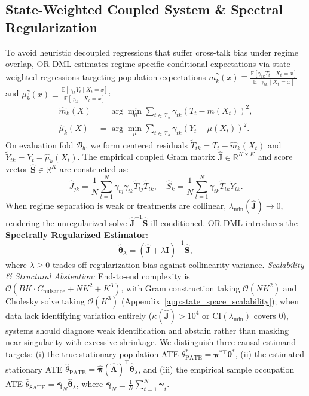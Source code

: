 \documentclass[twoside]{article}
\theoremstyle{definition}
\newcommand{\E}{\mathbb{E}}
\newcommand{\R}{\mathbb{R}}
\begin{document}
\subsection{State-Weighted Coupled System \& Spectral Regularization}
To avoid heuristic decoupled regressions that suffer cross-talk bias under regime overlap, OR-DML estimates regime-specific conditional expectations via state-weighted regressions targeting population expectations $m_k^\gamma(x) \equiv \frac{\E[\gamma_{tk} T_t \mid X_t=x]}{\E[\gamma_{tk} \mid X_t=x]}$ and $\mu_k^\gamma(x) \equiv \frac{\E[\gamma_{tk} Y_t \mid X_t=x]}{\E[\gamma_{tk} \mid X_t=x]}$:
\begin{align}
    \hat{m}_k(X) &= \arg\min_{m} \sum_{t \in \mathcal{T}_b} \gamma_{tk} (T_t - m(X_t))^2, \label{eq:nuisance_m} \\
    \hat{\mu}_k(X) &= \arg\min_{\mu} \sum_{t \in \mathcal{T}_b} \gamma_{tk} (Y_t - \mu(X_t))^2. \label{eq:nuisance_mu}
\end{align}
On evaluation fold $\mathcal{B}_b$, we form centered residuals $\tilde{T}_{tk} = T_t - \hat{m}_k(X_t)$ and $\tilde{Y}_{tk} = Y_t - \hat{\mu}_k(X_t)$. The empirical coupled Gram matrix $\hat{\boldsymbol{J}} \in \R^{K \times K}$ and score vector $\hat{\boldsymbol{S}} \in \R^K$ are constructed as:
\begin{equation}
    \hat{J}_{jk} = \frac{1}{N}\sum_{t=1}^N \gamma_{tj}\gamma_{tk} \tilde{T}_{tj} \tilde{T}_{tk}, \quad \hat{S}_k = \frac{1}{N}\sum_{t=1}^N \gamma_{tk} \tilde{T}_{tk} \tilde{Y}_{tk}.
\end{equation}
When regime separation is weak or treatments are collinear, $\lambda_{\min}(\hat{\boldsymbol{J}}) \to 0$, rendering the unregularized solve $\hat{\boldsymbol{J}}^{-1}\hat{\boldsymbol{S}}$ ill-conditioned. OR-DML introduces the \textbf{Spectrally Regularized Estimator}:
\begin{equation}
\label{eq:theta_spectral}
    \hat{\boldsymbol{\theta}}_\lambda = (\hat{\boldsymbol{J}} + \lambda \boldsymbol{I})^{-1} \hat{\boldsymbol{S}},
\end{equation}
where $\lambda \ge 0$ trades off regularization bias against collinearity variance.
\emph{Scalability \& Structural Abstention:} End-to-end complexity is $\mathcal{O}(B K \cdot C_{\mathrm{nuisance}} + N K^2 + K^3)$, with Gram construction taking $\mathcal{O}(N K^2)$ and Cholesky solve taking $\mathcal{O}(K^3)$ (Appendix~\ref{app:state_space_scalability}); when data lack identifying variation entirely ($\kappa(\hat{\boldsymbol{J}}) > 10^4$ or $\text{CI}(\lambda_{\min})$ covers 0), systems should diagnose weak identification and abstain rather than masking near-singularity with excessive shrinkage.
We distinguish three causal estimand targets: (i) the true stationary population ATE $\theta_{\mathrm{PATE}}^* = \boldsymbol{\pi}^{*\top} \boldsymbol{\theta}^*$, (ii) the estimated stationary ATE $\hat{\theta}_{\mathrm{PATE}} = \hat{\boldsymbol{\pi}}(\hat{\boldsymbol{\Lambda}})^\top \hat{\boldsymbol{\theta}}_\lambda$, and (iii) the empirical sample occupation ATE $\hat{\theta}_{\mathrm{SATE}} = \bar{\boldsymbol{\gamma}}_N^\top \hat{\boldsymbol{\theta}}_\lambda$, where $\bar{\boldsymbol{\gamma}}_N \equiv \frac{1}{N}\sum_{t=1}^N \boldsymbol{\gamma}_t$.
\end{document}
